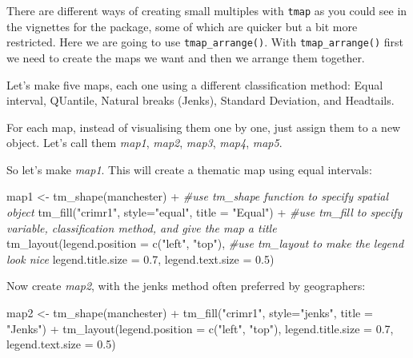 \documentclass[
]{book}
\newenvironment{Shaded}{\begin{snugshade}}{\end{snugshade}}
\newcommand{\AttributeTok}[1]{\textcolor[rgb]{0.77,0.63,0.00}{#1}}
\newcommand{\CommentTok}[1]{\textcolor[rgb]{0.56,0.35,0.01}{\textit{#1}}}
\newcommand{\FloatTok}[1]{\textcolor[rgb]{0.00,0.00,0.81}{#1}}
\newcommand{\FunctionTok}[1]{\textcolor[rgb]{0.00,0.00,0.00}{#1}}
\newcommand{\NormalTok}[1]{#1}
\newcommand{\OtherTok}[1]{\textcolor[rgb]{0.56,0.35,0.01}{#1}}
\newcommand{\SpecialCharTok}[1]{\textcolor[rgb]{0.00,0.00,0.00}{#1}}
\newcommand{\StringTok}[1]{\textcolor[rgb]{0.31,0.60,0.02}{#1}}
\begin{document}
There are different ways of creating small multiples with \texttt{tmap} as you could see in the vignettes for the package, some of which are quicker but a bit more restricted. Here we are going to use \texttt{tmap\_arrange()}. With \texttt{tmap\_arrange()} first we need to create the maps we want and then we arrange them together.

Let's make five maps, each one using a different classification method: Equal interval, QUantile, Natural breaks (Jenks), Standard Deviation, and Headtails.

For each map, instead of visualising them one by one, just assign them to a new object. Let's call them \emph{map1}, \emph{map2}, \emph{map3}, \emph{map4}, \emph{map5}.

So let's make \emph{map1}. This will create a thematic map using equal intervals:

\begin{Shaded}
\begin{Highlighting}[]
\NormalTok{map1 }\OtherTok{\textless{}{-}} \FunctionTok{tm\_shape}\NormalTok{(manchester) }\SpecialCharTok{+}                   \CommentTok{\#use tm\_shape function to specify spatial object}
  \FunctionTok{tm\_fill}\NormalTok{(}\StringTok{"crimr1"}\NormalTok{, }\AttributeTok{style=}\StringTok{"equal"}\NormalTok{, }\AttributeTok{title =} \StringTok{"Equal"}\NormalTok{) }\SpecialCharTok{+}  \CommentTok{\#use tm\_fill to specify variable, classification method, and give the map a title}
  \FunctionTok{tm\_layout}\NormalTok{(}\AttributeTok{legend.position =} \FunctionTok{c}\NormalTok{(}\StringTok{"left"}\NormalTok{, }\StringTok{"top"}\NormalTok{),   }\CommentTok{\#use tm\_layout to make the legend look nice}
            \AttributeTok{legend.title.size =} \FloatTok{0.7}\NormalTok{,}
            \AttributeTok{legend.text.size =} \FloatTok{0.5}\NormalTok{)}
\end{Highlighting}
\end{Shaded}

Now create \emph{map2}, with the jenks method often preferred by geographers:

\begin{Shaded}
\begin{Highlighting}[]
\NormalTok{map2 }\OtherTok{\textless{}{-}} \FunctionTok{tm\_shape}\NormalTok{(manchester) }\SpecialCharTok{+} 
  \FunctionTok{tm\_fill}\NormalTok{(}\StringTok{"crimr1"}\NormalTok{, }\AttributeTok{style=}\StringTok{"jenks"}\NormalTok{, }\AttributeTok{title =} \StringTok{"Jenks"}\NormalTok{) }\SpecialCharTok{+}
  \FunctionTok{tm\_layout}\NormalTok{(}\AttributeTok{legend.position =} \FunctionTok{c}\NormalTok{(}\StringTok{"left"}\NormalTok{, }\StringTok{"top"}\NormalTok{), }
            \AttributeTok{legend.title.size =} \FloatTok{0.7}\NormalTok{,}
            \AttributeTok{legend.text.size =} \FloatTok{0.5}\NormalTok{)}
\end{Highlighting}
\end{Shaded}
\end{document}
